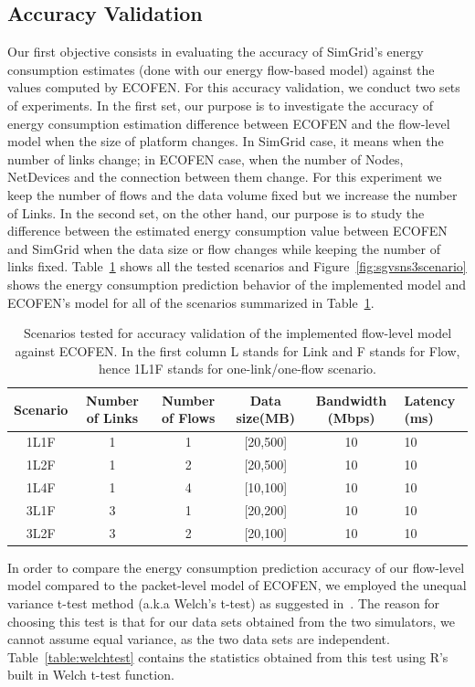 \subsection{Accuracy Validation}
Our first objective consists in evaluating the accuracy of SimGrid's energy consumption estimates (done with our energy flow-based model) against the values computed by ECOFEN.
For this accuracy validation, we conduct two sets of experiments. In the first set, our purpose is to investigate the accuracy of energy consumption estimation difference between ECOFEN and the flow-level model when the size of platform changes. In SimGrid case, it means when the number of links change; in ECOFEN case, when the number of Nodes, NetDevices and the connection between them change. For this experiment we keep the number of flows and the data volume fixed but we increase the number of Links. In the second set, on the other hand, our purpose is to study the difference between the estimated energy consumption value between ECOFEN and SimGrid when the data size or flow changes while keeping the number of links fixed. Table~\ref{table:accuracyscenarios} shows all the tested scenarios and Figure~\ref{fig:sgvsns3scenario} shows the energy consumption prediction behavior of the implemented model and ECOFEN's model for all of the scenarios summarized in Table~\ref{table:accuracyscenarios}.

\begin{table}
		\caption{Scenarios tested for accuracy validation of the implemented flow-level model against ECOFEN. In the first column L stands for Link and F stands for Flow, hence 1L1F stands for one-link/one-flow scenario.}
		\label{table:accuracyscenarios}
	\begin{tabular}{cccccl} 
		\toprule
		\textbf{Scenario} &	\textbf{Number of Links} & \textbf{Number of Flows} & \textbf{Data size(MB)} & \textbf{Bandwidth (Mbps)}& \textbf{Latency (ms)}\\ 
		\midrule
		1L1F&1&1&[20,500]&10&10\\
		1L2F&1&2&[20,500]&10&10\\ 
		1L4F&1&4&[10,100]&10&10\\  
		3L1F&3&1&[20,200]&10&10\\ 
		3L2F&3&2&[20,100]&10&10\\ 
		\bottomrule
	\end{tabular} 

\end{table}

In order to compare the energy consumption prediction accuracy of our flow-level model compared to the packet-level model of ECOFEN, we employed the unequal variance t-test method (a.k.a Welch's t-test) as suggested in~\cite{ruxton2006unequal}. The reason for choosing this test is that for our data sets obtained from the two simulators, we cannot assume equal variance, as the two data sets are independent. Table~\ref{table:welchtest} contains the statistics obtained from this test using R's built in Welch t-test function. 

